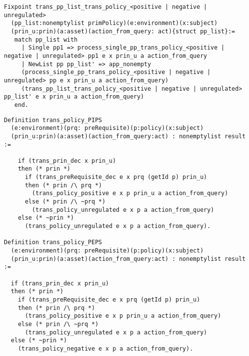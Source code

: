 \begin{lstlisting}
Fixpoint trans_pp_list_trans_policy_<positive | negative | unregulated> 
  (pp_list:nonemptylist primPolicy)(e:environment)(x:subject)
  (prin_u:prin)(a:asset)(action_from_query: act){struct pp_list}:=
   match pp_list with
     | Single pp1 => process_single_pp_trans_policy_<positive | negative | unregulated> pp1 e x prin_u a action_from_query
     | NewList pp pp_list' => app_nonempty
	 (process_single_pp_trans_policy_<positive | negative | unregulated> pp e x prin_u a action_from_query) 
	 (trans_pp_list_trans_policy_<positive | negative | unregulated> pp_list' e x prin_u a action_from_query)
   end.
\end{lstlisting}


\begin{minipage}{\linewidth}
\begin{lstlisting}
Definition trans_policy_PIPS
  (e:environment)(prq: preRequisite)(p:policy)(x:subject)
  (prin_u:prin)(a:asset)(action_from_query:act) : nonemptylist result :=
  
    if (trans_prin_dec x prin_u)
    then (* prin *)
      if (trans_preRequisite_dec e x prq (getId p) prin_u)
      then (* prin /\ prq *)
        (trans_policy_positive e x p prin_u a action_from_query)                           
      else (* prin /\ ~prq *)
        (trans_policy_unregulated e x p a action_from_query)
    else (* ~prin *)
      (trans_policy_unregulated e x p a action_from_query).

Definition trans_policy_PEPS
  (e:environment)(prq: preRequisite)(p:policy)(x:subject)
  (prin_u:prin)(a:asset)(action_from_query:act) : nonemptylist result :=
  
  if (trans_prin_dec x prin_u)
  then (* prin *)
    if (trans_preRequisite_dec e x prq (getId p) prin_u)
    then (* prin /\ prq *)
      (trans_policy_positive e x p prin_u a action_from_query)
    else (* prin /\ ~prq *)
      (trans_policy_unregulated e x p a action_from_query)
  else (* ~prin *)
    (trans_policy_negative e x p a action_from_query).

\end{lstlisting}
\end{minipage}


